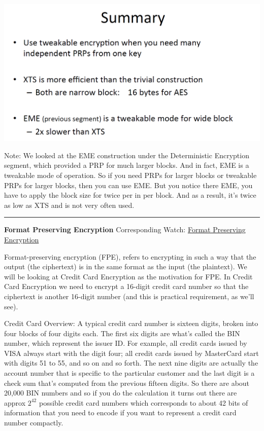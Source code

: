 \documentclass[11pt]{article}
\makeatletter
\def\maxwidth{\ifdim\Gin@nat@width>\linewidth\linewidth
    \else\Gin@nat@width\fi}
\let\Oldincludegraphics\includegraphics
\renewcommand{\includegraphics}[1]{\Oldincludegraphics[width=.8\maxwidth]{#1}}
\makeatother
\begin{document}
\includegraphics{./Images/TweakableEncryption-Summary.png}

Note: We looked at the EME construction under the Deterministic
Encryption segment, which provided a PRP for much larger blocks. And in
fact, EME is a tweakable mode of operation. So if you need PRPs for
larger blocks or tweakable PRPs for larger blocks, then you can use EME.
But you notice there EME, you have to apply the block size for twice per
in per block. And as a result, it's twice as low as XTS and is not very
often used.

\begin{center}\rule{0.5\linewidth}{\linethickness}\end{center}

\textbf{Format Preserving Encryption} Corresponding Watch:
\href{https://www.coursera.org/learn/crypto/lecture/aFRSZ/format-preserving-encryption}{Format
Preserving Encryption}

Format-preserving encryption (FPE), refers to encrypting in such a way
that the output (the ciphertext) is in the same format as the input (the
plaintext). We will be looking at Credit Card Encryption as the
motivation for FPE. In Credit Card Encryption we need to encrypt a
16-digit credit card number so that the ciphertext is another 16-digit
number (and this is practical requirement, as we'll see).

Credit Card Overview: A typical credit card number is sixteen digits,
broken into four blocks of four digits each. The first six digits are
what's called the BIN number, which represent the issuer ID. For
example, all credit cards issued by VISA always start with the digit
four; all credit cards issued by MasterCard start with digits 51 to 55,
and so on and so forth. The next nine digits are actually the account
number that is specific to the particular customer and the last digit is
a check sum that's computed from the previous fifteen digits. So there
are about 20,000 BIN numbers and so if you do the calculation it turns
out there are approx \(2^{42}\) possible credit card numbers which
corresponds to about 42 bits of information that you need to encode if
you want to represent a credit card number compactly.
\end{document}
